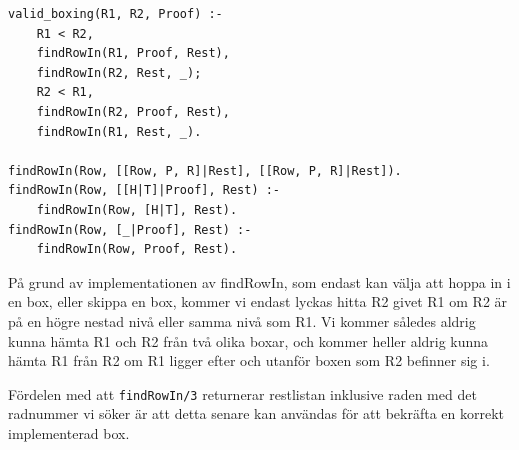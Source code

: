 \documentclass[a4paper]{article}
\begin{document}
\begin{verbatim}
valid_boxing(R1, R2, Proof) :-
	R1 < R2,
	findRowIn(R1, Proof, Rest),
	findRowIn(R2, Rest, _);
	R2 < R1,
	findRowIn(R2, Proof, Rest),
	findRowIn(R1, Rest, _).

findRowIn(Row, [[Row, P, R]|Rest], [[Row, P, R]|Rest]).
findRowIn(Row, [[H|T]|Proof], Rest) :-
	findRowIn(Row, [H|T], Rest).
findRowIn(Row, [_|Proof], Rest) :-
	findRowIn(Row, Proof, Rest).
\end{verbatim}
På grund av implementationen av findRowIn, som endast kan välja att hoppa in i en box, eller skippa en box, kommer vi endast lyckas hitta R2 givet R1 om R2 är på en högre nestad nivå eller samma nivå som R1. Vi kommer således aldrig kunna hämta R1 och R2 från två olika boxar, och kommer heller aldrig kunna hämta R1 från R2 om R1 ligger efter och utanför boxen som R2 befinner sig i.

Fördelen med att \texttt{findRowIn/3} returnerar restlistan inklusive raden med det radnummer vi söker är att detta senare kan användas för att bekräfta en korrekt implementerad box.
\end{document}

